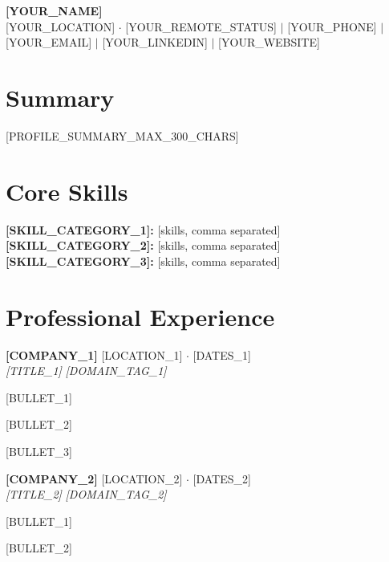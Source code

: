 \documentclass[10pt,letterpaper]{article}
\renewenvironment{itemize}
  {\begin{olditemize}\setlength{\itemsep}{1pt}\setlength{\parskip}{0pt}\setlength{\topsep}{2pt}\setlength{\leftmargini}{1.1em}}
  {\end{olditemize}}
\begin{document}
{\fontsize{20}{22}\selectfont\bfseries [YOUR_NAME]}\\[3pt]
[YOUR_LOCATION] $\cdot$ [YOUR_REMOTE_STATUS] $\mid$ [YOUR_PHONE] $\mid$ [YOUR_EMAIL] $\mid$ [YOUR_LINKEDIN] $\mid$ [YOUR_WEBSITE]

\section*{Summary}
[PROFILE_SUMMARY_MAX_300_CHARS]

\section*{Core Skills}
\textbf{[SKILL_CATEGORY_1]:} [skills, comma separated]\\
\textbf{[SKILL_CATEGORY_2]:} [skills, comma separated]\\
\textbf{[SKILL_CATEGORY_3]:} [skills, comma separated]

\section*{Professional Experience}

\noindent\textbf{[COMPANY_1]} \hfill [LOCATION_1] $\cdot$ [DATES_1]\\
\textit{[TITLE_1]} \hfill \textit{[DOMAIN_TAG_1]}
\begin{itemize}
    \item{} [BULLET_1]
    \item{} [BULLET_2]
    \item{} [BULLET_3]
\end{itemize}

\noindent\textbf{[COMPANY_2]} \hfill [LOCATION_2] $\cdot$ [DATES_2]\\
\textit{[TITLE_2]} \hfill \textit{[DOMAIN_TAG_2]}
\begin{itemize}
    \item{} [BULLET_1]
    \item{} [BULLET_2]
\end{itemize}
\end{document}
